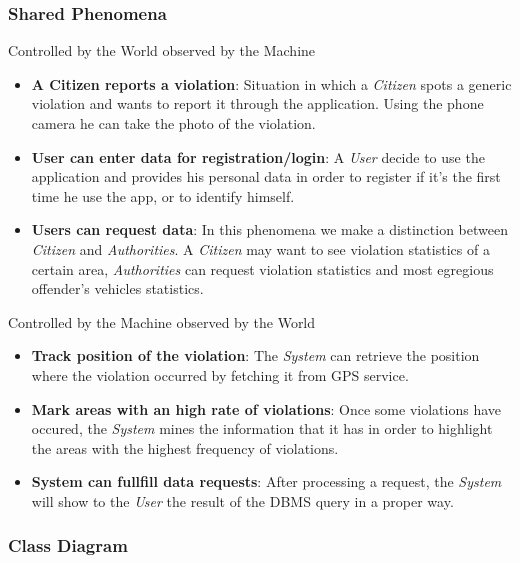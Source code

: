 \documentclass{article}
\begin{document}
\subsubsection{Shared Phenomena}
Controlled by the World observed by the Machine
\begin{itemize}
    \item \textbf{A Citizen reports a violation}:
    Situation in which a \textit{Citizen} spots a generic violation and wants
    to report it through the application. Using the phone camera he
    can take the photo of the violation.
    \item \textbf{User can enter data for registration/login}:
    A \textit{User} decide to use the application and provides his personal data
    in order to register if it's the first time he use the app, or to
    identify himself.
    \item \textbf{Users can request data}:
    In this phenomena we make a distinction between \textit{Citizen} and \textit{Authorities}.
    A \textit{Citizen} may want to see violation statistics of a certain area, \textit{Authorities} can request
    violation statistics and most egregious offender's vehicles statistics.
\end{itemize}

Controlled by the Machine observed by the World
\begin{itemize}
    \item \textbf{Track position of the violation}:
    The \textit{System} can retrieve the position where the violation occurred by fetching it from GPS service.
    \item \textbf{Mark areas with an high rate of violations}:
    Once some violations have occured, the \textit{System} mines the information that it has in 
    order to highlight the areas with the highest frequency of violations.
    \item\textbf{System can fullfill data requests}:
    After processing a request, the \textit{System} will show to the \textit{User} the result of the 
    DBMS query in a proper way.
\end{itemize}

\subsubsection{Class Diagram} 
\end{document}
